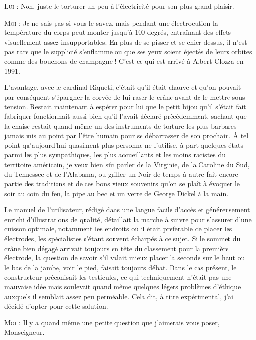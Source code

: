 \textsc{Lui} : Non, juste le torturer un peu à l’électricité pour son plus grand plaisir.

\textsc{Moi} : Je ne sais pas si vous le savez, mais pendant une électrocution la température du corps peut monter jusqu’à 100 degrés, entraînant des effets visuellement assez insupportables. En plus de se pisser et se chier dessus, il n’est pas rare que le supplicié s’enflamme ou que ses yeux soient éjectés de leurs orbites comme des bouchons de champagne ! C’est ce qui est arrivé à Albert Clozza en 1991.

L’avantage, avec le cardinal Riqueti, c’était qu’il était chauve et qu’on pouvait par conséquent s’épargner la corvée de lui raser le crâne avant de le mettre sous tension. Restait maintenant à espérer pour lui que le petit bijou qu’il s’était fait fabriquer fonctionnait aussi bien qu’il l’avait déclaré précédemment, sachant que la chaise restait quand même un des instruments de torture les plus barbares jamais mis au point par l’être humain pour se débarrasser de son prochain. À tel point qu’aujourd’hui quasiment plus personne ne l’utilise, à part quelques états parmi les plus sympathiques, les plus accueillants et les moins racistes du territoire américain, je veux bien sûr parler de la Virginie, de la Caroline du Sud, du Tennessee et de l’Alabama, ou griller un Noir de temps à autre fait encore partie des traditions et de ces bons vieux souvenirs qu’on se plaît à évoquer le soir au coin du feu, la pipe au bec et un verre de George Dickel à la main.

Le manuel de l’utilisateur, rédigé dans une langue facile d’accès et généreusement enrichi d’illustrations de qualité, détaillait la marche à suivre pour s’assurer d’une cuisson optimale, notamment les endroits où il était préférable de placer les électrodes, les spécialistes s’étant souvent écharpés à ce sujet. Si le sommet du crâne bien dégagé arrivait toujours en tête du classement pour la première électrode, la question de savoir s’il valait mieux placer la seconde sur le haut ou le bas de la jambe, voir le pied, faisait toujours débat. Dans le cas présent, le constructeur préconisait les testicules, ce qui techniquement n’était pas une mauvaise idée mais soulevait quand même quelques légers problèmes d’éthique auxquels il semblait assez peu perméable. Cela dit, à titre expérimental, j’ai décidé d’opter pour cette solution.

\textsc{Moi} : Il y a quand même une petite question que j’aimerais vous poser, Monseigneur.

